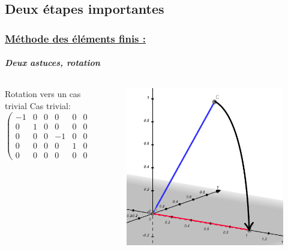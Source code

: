 \documentclass[10pt]{beamer}
\begin{document}
	\subsection{Deux \'etapes importantes}
	\begin{frame}
		\frametitle{\uline{M\'ethode des \'el\'ements finis :}}
		\framesubtitle{\textit{Deux astuces, rotation}}
		\begin{columns}[t]
			\begin{column}{5cm}
				\begin{block}{Rotation vers un cas trivial}
					Cas trivial:
  					\begin{equation}
						\begin{pmatrix}
							-1 & 0 & 0 & 0 & 0 & 0\\
							0 & 1 & 0 & 0 & 0 & 0\\
							0 & 0 & 0 & -1 & 0 & 0 \\
							0 & 0 & 0 & 0 & 1 & 0 \\
							0 & 0 & 0 & 0 & 0 & 0
						\end{pmatrix}
					\end{equation}
				\end{block}
  			\end{column}
 			\begin{column}{5cm}
 				\begin{figure}
 				 	\includegraphics[scale=0.35]{Images/CasFinal.png}
 				\end{figure}
			\end{column}
 		\end{columns}
	\end{frame}
\end{document}
